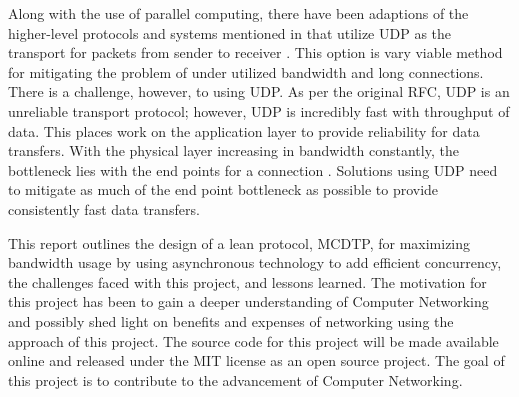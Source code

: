 Along with the use of parallel computing, there have been adaptions of the higher-level protocols and systems mentioned in \cite{Fan2010} that utilize UDP as the transport for packets from sender to receiver \cite{He2002}\cite{Aspera2016}\cite{Fan2010}\cite{Meiss2007}\cite{gu2007udt}. This option is vary viable method for mitigating the problem of under utilized bandwidth and long connections. There is a challenge, however, to using UDP. As per the original RFC, UDP is an unreliable transport protocol; however, UDP is incredibly fast with throughput of data. This places work on the application layer to provide reliability for data transfers. With the physical layer increasing in bandwidth constantly, the bottleneck lies with the end points for a connection \cite{Aspera2016}\cite{Fan2010}. Solutions using UDP need to mitigate as much of the end point bottleneck as possible to provide consistently fast data transfers.

This report outlines the design of a lean protocol, MCDTP, for maximizing bandwidth usage by using asynchronous technology to add efficient concurrency, the challenges faced with this project, and lessons learned. The motivation for this project has been to gain a deeper understanding of Computer Networking and possibly shed light on benefits and expenses of networking using the approach of this project. The source code for this project will be made available online and released under the MIT license as an open source project. The goal of this project is to contribute to the advancement of Computer Networking.
